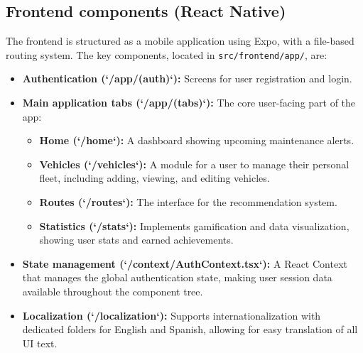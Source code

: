 \subsection{Frontend components (React Native)}
The frontend is structured as a mobile application using Expo, with a file-based routing system. The key components, located in \texttt{src/frontend/app/}, are:
\begin{itemize}
    \item \textbf{Authentication (`/app/(auth)`):} Screens for user registration and login.
    \item \textbf{Main application tabs (`/app/(tabs)`):} The core user-facing part of the app:
    \begin{itemize}
        \item \textbf{Home (`/home`):} A dashboard showing upcoming maintenance alerts.
        \item \textbf{Vehicles (`/vehicles`):} A module for a user to manage their personal fleet, including adding, viewing, and editing vehicles.
        \item \textbf{Routes (`/routes`):} The interface for the recommendation system.
        \item \textbf{Statistics (`/stats`):} Implements gamification and data visualization, showing user stats and earned achievements.
    \end{itemize}
    \item \textbf{State management (`/context/AuthContext.tsx`):} A React Context that manages the global authentication state, making user session data available throughout the component tree.
    \item \textbf{Localization (`/localization`):} Supports internationalization with dedicated folders for English and Spanish, allowing for easy translation of all UI text.
\end{itemize}


